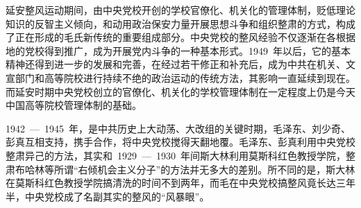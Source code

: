 延安整风运动期间，由中央党校开创的学校官僚化、机关化的管理体制，贬低理论知识的反智主义倾向，和动用政治保安力量开展思想斗争和组织整肃的方式，构成了正在形成的毛氏新传统的重要组成部分。中央党校的整风经验不仅逐渐在各根据地的党校得到推广，成为开展党内斗争的一种基本形式。1949~年以后，它的基本精神还得到进一步的发展和完善，在经过若干修正和补充后，成为中共在机关、文宣部门和高等院校进行持续不绝的政治运动的传统方法，其影响一直延续到现在。而延安时期中央党校创立的官僚化、机关化的学校管理体制在一定程度上仍是今天中国高等院校管理体制的基础。

1942~—~1945~年，是中共历史上大动荡、大改组的关键时期，毛泽东、刘少奇、彭真互相支持，携手合作，将中央党校搅得天翻地覆。毛泽东、彭真利用中央党校整肃异己的方法，其实和~1929~—~1930~年间斯大林利用莫斯科红色教授学院，整肃布哈林等所谓“右倾机会主义分子”的方法并无多大的差别。所不同的是，斯大林在莫斯科红色教授学院搞清洗的时间不到两年，而毛在中央党校搞整风竟长达三年半，中央党校成了名副其实的整风的“风暴眼”。